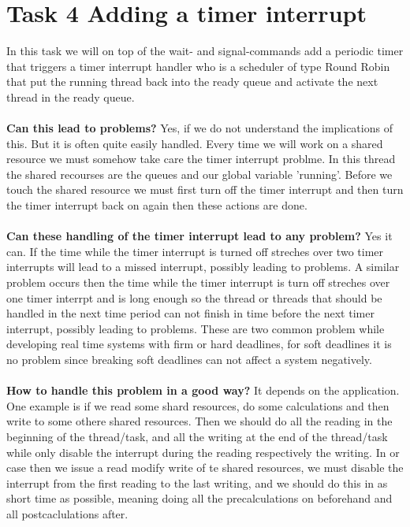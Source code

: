 \documentclass[10pt,a4paper]{article}
\begin{document}
\section*{Task 4 Adding a timer interrupt}
In this task we will on top of the wait- and signal-commands add a periodic timer that triggers a timer interrupt handler who is a scheduler of type Round Robin that put the running thread back into the ready queue and activate the next thread in the ready queue.\\
\\
\textbf{Can this lead to problems?}
Yes, if we do not understand the implications of this. But it is often quite easily handled. Every time we will work on a shared resource we must somehow take care the timer interrupt problme. In this thread the shared recourses are the queues and our global variable 'running'. Before we touch the shared resource we must first turn off the timer interrupt and then turn the timer interrupt back on again then these actions are done.\\
\\
\textbf{Can these handling of the timer interrupt lead to any problem?}
Yes it can. If the time while the timer interrupt is turned off streches over two timer interrupts will lead to a missed interrupt, possibly leading to problems. A similar problem occurs then the time while the timer interrupt is turn off streches over one timer interrpt and is long enough so the thread or threads that should be handled in the next time period can not finish in time before the next timer interrupt, possibly leading to problems. These are two common problem while developing real time systems with firm or hard deadlines, for soft deadlines it is no problem since breaking soft deadlines can not affect a system negatively.\\
\\
\textbf{How to handle this problem in a good way?}
It depends on the application. One example is if we read some shard resources, do some calculations and then write to some othere shared resources. Then we should do all the reading in the beginning of the thread/task, and all the writing at the end of the thread/task while only disable the interrupt during the reading respectively the writing. In or case then we issue a read modify write of te shared resources, we must disable the interrupt from the first reading to the last writing, and we should do this in as short time as possible, meaning doing all the precalculations on beforehand and all postcaclulations after.
\end{document}
